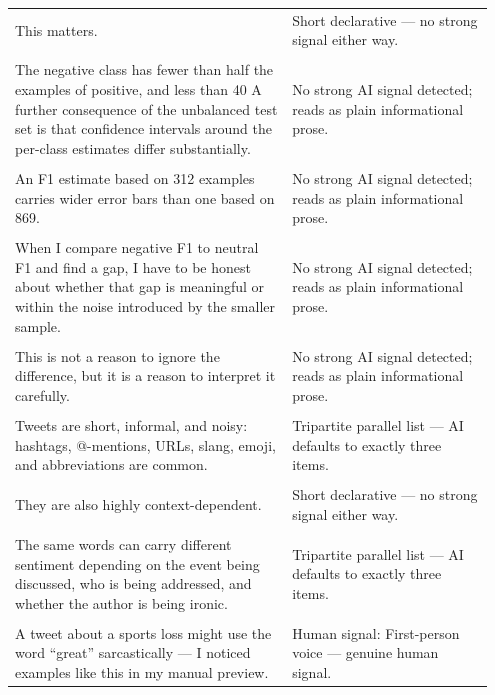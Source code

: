 \documentclass[11pt]{article}
\begin{document}
\begin{longtable}{|p{0.55\linewidth}|p{0.40\linewidth}|}
\hline
\rule{0pt}{3.5cm} & \\
\hline
This matters. & Short declarative --- no strong signal either way. \\[2pt]
\hline
\rule{0pt}{3.5cm} & \\
\hline
The negative class has fewer than half the examples of positive, and less than 40 A further consequence of the unbalanced test set is that confidence intervals around the per-class estimates differ substantially. & No strong AI signal detected; reads as plain informational prose. \\[2pt]
\hline
\rule{0pt}{3.5cm} & \\
\hline
An F1 estimate based on 312 examples carries wider error bars than one based on 869. & No strong AI signal detected; reads as plain informational prose. \\[2pt]
\hline
\rule{0pt}{3.5cm} & \\
\hline
When I compare negative F1 to neutral F1 and find a gap, I have to be honest about whether that gap is meaningful or within the noise introduced by the smaller sample. & No strong AI signal detected; reads as plain informational prose. \\[2pt]
\hline
\rule{0pt}{3.5cm} & \\
\hline
This is not a reason to ignore the difference, but it is a reason to interpret it carefully. & No strong AI signal detected; reads as plain informational prose. \\[2pt]
\hline
\rule{0pt}{3.5cm} & \\
\hline
Tweets are short, informal, and noisy: hashtags, @-mentions, URLs, slang, emoji, and abbreviations are common. & Tripartite parallel list --- AI defaults to exactly three items. \\[2pt]
\hline
\rule{0pt}{3.5cm} & \\
\hline
They are also highly context-dependent. & Short declarative --- no strong signal either way. \\[2pt]
\hline
\rule{0pt}{3.5cm} & \\
\hline
The same words can carry different sentiment depending on the event being discussed, who is being addressed, and whether the author is being ironic. & Tripartite parallel list --- AI defaults to exactly three items. \\[2pt]
\hline
\rule{0pt}{3.5cm} & \\
\hline
A tweet about a sports loss might use the word ``great'' sarcastically --- I noticed examples like this in my manual preview. & Human signal: First-person voice --- genuine human signal. \\[2pt]

\end{longtable}
\end{document}
